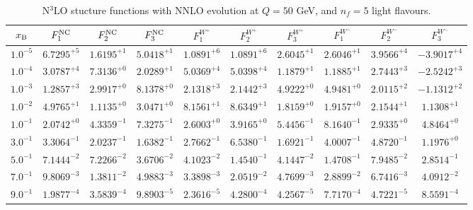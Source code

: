 \begin{table}[h]
\begin{adjustbox}{width=\textwidth}
\begin{tabular}{|c||c|c|c|c|c|c|c|c|c|}
\hline
$x_{\rm B}$ & $F_1^{\rm NC}$ & $F_2^{\rm NC}$ & $F_3^{\rm NC}$ & $F_1^{W^+}$ & $F_2^{W^+}$ & $F_3^{W^+}$ & $F_1^{W^-}$ & $F_2^{W^-}$ & $F_3^{W^-}$ \\
\hline
$ 1.0^{-5}$ & $ 6.7295^{+5}$ & $ 1.6195^{+1}$ & $ 5.0418^{+1}$ & $ 1.0891^{+6}$ & $ 1.0891^{+6}$ & $ 2.6045^{+1}$ & $ 2.6046^{+1}$ & $ 3.9566^{+4}$ & $-3.9017^{+4}$ \\
$ 1.0^{-4}$ & $ 3.0787^{+4}$ & $ 7.3136^{+0}$ & $ 2.0289^{+1}$ & $ 5.0369^{+4}$ & $ 5.0398^{+4}$ & $ 1.1879^{+1}$ & $ 1.1885^{+1}$ & $ 2.7443^{+3}$ & $-2.5242^{+3}$ \\
$ 1.0^{-3}$ & $ 1.2857^{+3}$ & $ 2.9917^{+0}$ & $ 8.1378^{+0}$ & $ 2.1318^{+3}$ & $ 2.1442^{+3}$ & $ 4.9222^{+0}$ & $ 4.9481^{+0}$ & $ 2.0115^{+2}$ & $-1.1312^{+2}$ \\
$ 1.0^{-2}$ & $ 4.9765^{+1}$ & $ 1.1135^{+0}$ & $ 3.0471^{+0}$ & $ 8.1561^{+1}$ & $ 8.6349^{+1}$ & $ 1.8159^{+0}$ & $ 1.9157^{+0}$ & $ 2.1544^{+1}$ & $ 1.1308^{+1}$ \\
$ 1.0^{-1}$ & $ 2.0742^{+0}$ & $ 4.3359^{-1}$ & $ 7.3275^{-1}$ & $ 2.6003^{+0}$ & $ 3.9165^{+0}$ & $ 5.4456^{-1}$ & $ 8.1640^{-1}$ & $ 2.9335^{+0}$ & $ 4.8464^{+0}$ \\
$ 3.0^{-1}$ & $ 3.3064^{-1}$ & $ 2.0237^{-1}$ & $ 1.6382^{-1}$ & $ 2.7662^{-1}$ & $ 6.5380^{-1}$ & $ 1.6921^{-1}$ & $ 4.0007^{-1}$ & $ 4.8720^{-1}$ & $ 1.1976^{+0}$ \\
$ 5.0^{-1}$ & $ 7.1444^{-2}$ & $ 7.2266^{-2}$ & $ 3.6706^{-2}$ & $ 4.1023^{-2}$ & $ 1.4540^{-1}$ & $ 4.1447^{-2}$ & $ 1.4708^{-1}$ & $ 7.9485^{-2}$ & $ 2.8514^{-1}$ \\
$ 7.0^{-1}$ & $ 9.8069^{-3}$ & $ 1.3811^{-2}$ & $ 4.9883^{-3}$ & $ 3.3898^{-3}$ & $ 2.0519^{-2}$ & $ 4.7699^{-3}$ & $ 2.8899^{-2}$ & $ 6.7416^{-3}$ & $ 4.0912^{-2}$ \\
$ 9.0^{-1}$ & $ 1.9877^{-4}$ & $ 3.5839^{-4}$ & $ 9.8903^{-5}$ & $ 2.3616^{-5}$ & $ 4.2800^{-4}$ & $ 4.2567^{-5}$ & $ 7.7170^{-4}$ & $ 4.7221^{-5}$ & $ 8.5591^{-4}$ \\
\hline
\end{tabular}
\end{adjustbox}\caption{N$^{3}$LO stucture functions with NNLO evolution at $Q = 50$ GeV, and $n_f=5$ light flavours.}
\label{tab:N3LO-Q50}
\end{table}


